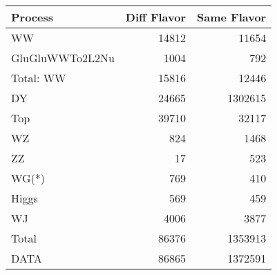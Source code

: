 \begin{table}[ht]
	\centering
\begin{tabular}{lrr}

         Process &  Diff Flavor &  Same Flavor \\
		\hline
              WW &        14812 &        11654 \\
 GluGluWWTo2L2Nu &         1004 &          792 \\
\hline
       Total: WW &        15816 &        12446 \\
              DY &        24665 &      1302615 \\
             Top &        39710 &        32117 \\
              WZ &          824 &         1468 \\
              ZZ &           17 &          523 \\
           WG(*) &          769 &          410 \\
           Higgs &          569 &          459 \\
              WJ &         4006 &         3877 \\
\hline
           Total &        86376 &      1353913 \\
            DATA &        86865 &      1372591 \\


\end{tabular}

\end{table}